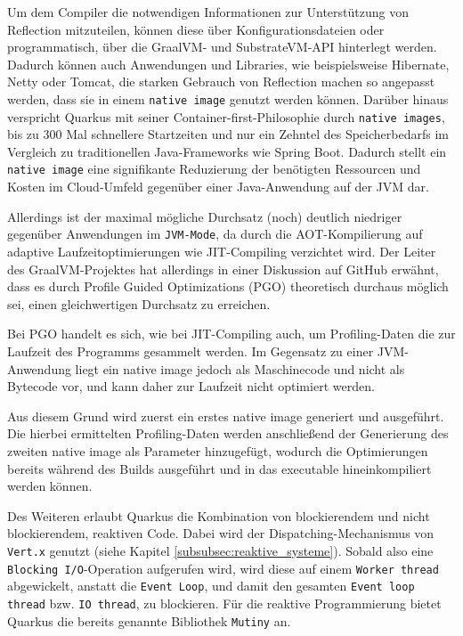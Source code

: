 Um dem Compiler die notwendigen Informationen zur Unterstützung von Reflection mitzuteilen, können
diese über Konfigurationsdateien oder programmatisch, über die GraalVM- und SubstrateVM-API hinterlegt werden.
Dadurch können auch Anwendungen und Libraries, wie beispielsweise Hibernate, Netty oder Tomcat,
die starken Gebrauch von Reflection machen so angepasst werden, dass sie in einem \verb|native image| genutzt werden können.
\parencite{GraalVMNativeImage}
Darüber hinaus verspricht Quarkus mit seiner Container-first-Philosophie durch \verb|native images|, bis zu 300 Mal schnellere Startzeiten
und nur ein Zehntel des Speicherbedarfs im Vergleich zu traditionellen Java-Frameworks wie Spring Boot.
Dadurch stellt ein \verb|native image| eine signifikante Reduzierung der benötigten Ressourcen und Kosten
im Cloud-Umfeld gegenüber einer Java-Anwendung auf der JVM dar.
\parencite{RedHatQuarkusInfografik}

Allerdings ist der maximal mögliche Durchsatz (noch) deutlich niedriger gegenüber Anwendungen im \verb|JVM-Mode|, da durch die AOT-Kompilierung
auf adaptive Laufzeitoptimierungen wie JIT-Compiling verzichtet wird.
Der Leiter des GraalVM-Projektes hat allerdings in einer Diskussion auf GitHub erwähnt, dass es durch Profile Guided Optimizations (PGO)
theoretisch durchaus möglich sei, einen gleichwertigen Durchsatz zu erreichen\parencite{GraalWuerthinger}.

Bei PGO handelt es sich, wie bei JIT-Compiling auch, um Profiling-Daten die zur Laufzeit des Programms gesammelt werden.
Im Gegensatz zu einer JVM-Anwendung liegt ein native image jedoch als Maschinecode und nicht als Bytecode vor,
und kann daher zur Laufzeit nicht optimiert werden.

Aus diesem Grund wird zuerst ein erstes native image generiert und ausgeführt.
Die hierbei ermittelten Profiling-Daten werden anschließend der Generierung des zweiten native image als Parameter hinzugefügt,
wodurch die Optimierungen bereits während des Builds ausgeführt und in das executable hineinkompiliert werden können.\newline

Des Weiteren erlaubt Quarkus die Kombination von blockierendem und nicht blockierendem, reaktiven Code.
Dabei wird der Dispatching-Mechanismus von \verb|Vert.x| genutzt (siehe Kapitel \ref{subsubsec:reaktive_systeme}).
Sobald also eine \verb|Blocking I/O|-Operation aufgerufen wird, wird diese auf einem \verb|Worker thread| abgewickelt,
anstatt die \verb|Event Loop|, und damit den
gesamten \verb|Event loop thread| bzw. \verb|IO thread|, zu blockieren.
Für die reaktive Programmierung bietet Quarkus die bereits genannte Bibliothek \verb|Mutiny| an.\parencite{Quarkus}

